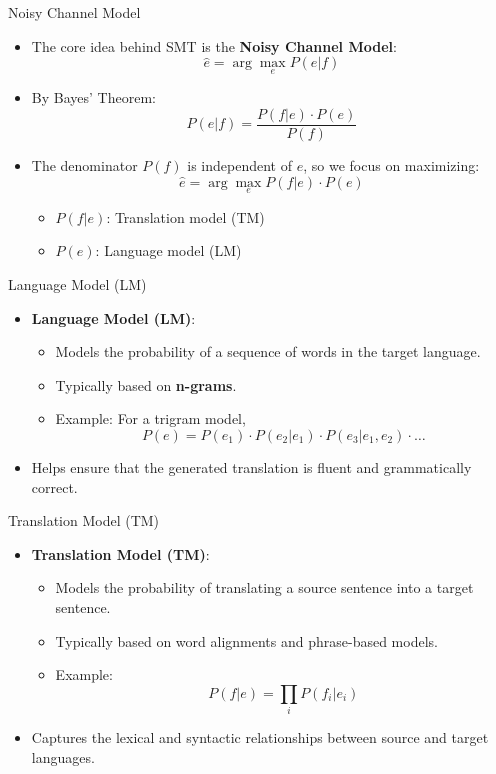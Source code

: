 \documentclass{beamer}
\begin{document}
\begin{frame}{Noisy Channel Model}
    \begin{itemize}
        \item The core idea behind SMT is the \textbf{Noisy Channel Model}:
        \[
        \hat{e} = \arg\max_{e} P(e | f)
        \]
        \item By Bayes' Theorem:
        \[
        P(e | f) = \frac{P(f | e) \cdot P(e)}{P(f)}
        \]
        \item The denominator \(P(f)\) is independent of \(e\), so we focus on maximizing:
        \[
        \hat{e} = \arg\max_{e} P(f | e) \cdot P(e)
        \]
        \begin{itemize}
            \item \(P(f | e)\): Translation model (TM)
            \item \(P(e)\): Language model (LM)
        \end{itemize}
    \end{itemize}
\end{frame}

\begin{frame}{Language Model (LM)}
    \begin{itemize}
        \item \textbf{Language Model (LM)}:
        \begin{itemize}
            \item Models the probability of a sequence of words in the target language.
            \item Typically based on \textbf{n-grams}.
            \item Example: For a trigram model,
            \[
            P(e) = P(e_1) \cdot P(e_2 | e_1) \cdot P(e_3 | e_1, e_2) \cdot \dots
            \]
        \end{itemize}
        \item Helps ensure that the generated translation is fluent and grammatically correct.
    \end{itemize}
\end{frame}

\begin{frame}{Translation Model (TM)}
    \begin{itemize}
        \item \textbf{Translation Model (TM)}:
        \begin{itemize}
            \item Models the probability of translating a source sentence into a target sentence.
            \item Typically based on word alignments and phrase-based models.
            \item Example:
            \[
            P(f | e) = \prod_{i} P(f_i | e_i)
            \]
        \end{itemize}
        \item Captures the lexical and syntactic relationships between source and target languages.
    \end{itemize}
\end{frame}
\end{document}
